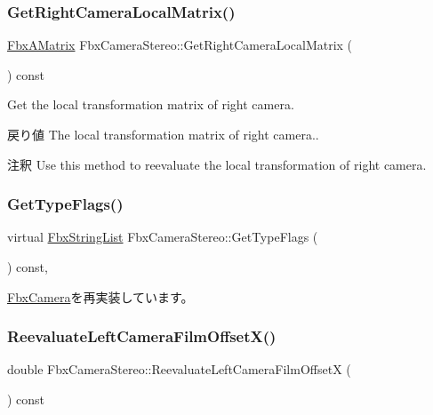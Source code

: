 \subsubsection{\texorpdfstring{Get\+Right\+Camera\+Local\+Matrix()}{GetRightCameraLocalMatrix()}}
{\footnotesize\ttfamily \hyperlink{class_fbx_a_matrix}{Fbx\+A\+Matrix} Fbx\+Camera\+Stereo\+::\+Get\+Right\+Camera\+Local\+Matrix (\begin{DoxyParamCaption}{ }\end{DoxyParamCaption}) const}

Get the local transformation matrix of right camera. \begin{DoxyReturn}{戻り値}
The local transformation matrix of right camera.. 
\end{DoxyReturn}
\begin{DoxyRemark}{注釈}
Use this method to reevaluate the local transformation of right camera. 
\end{DoxyRemark}
\mbox{\label{class_fbx_camera_stereo_a73c9df71edcd9a56b2710357b95fcde6}} 
\subsubsection{\texorpdfstring{Get\+Type\+Flags()}{GetTypeFlags()}}
{\footnotesize\ttfamily virtual \hyperlink{class_fbx_string_list}{Fbx\+String\+List} Fbx\+Camera\+Stereo\+::\+Get\+Type\+Flags (\begin{DoxyParamCaption}{ }\end{DoxyParamCaption}) const\hspace{0.3cm}{\ttfamily [protected]}, {\ttfamily [virtual]}}



\hyperlink{class_fbx_camera_ac52d0e82cbabac69f8b0dcd212853616}{Fbx\+Camera}を再実装しています。

\mbox{\label{class_fbx_camera_stereo_a372e001c8d6f950d787831dc57c5fc20}} 
\subsubsection{\texorpdfstring{Reevaluate\+Left\+Camera\+Film\+Offset\+X()}{ReevaluateLeftCameraFilmOffsetX()}}
{\footnotesize\ttfamily double Fbx\+Camera\+Stereo\+::\+Reevaluate\+Left\+Camera\+Film\+OffsetX (\begin{DoxyParamCaption}{ }\end{DoxyParamCaption}) const}

